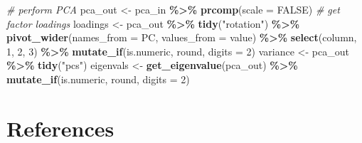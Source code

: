 \documentclass[12pt,twoside]{reedthesis}
\newenvironment{Shaded}{\begin{snugshade}}{\end{snugshade}}
\newcommand{\CommentTok}[1]{\textcolor[rgb]{0.56,0.35,0.01}{\textit{#1}}}
\newcommand{\DataTypeTok}[1]{\textcolor[rgb]{0.13,0.29,0.53}{#1}}
\newcommand{\DecValTok}[1]{\textcolor[rgb]{0.00,0.00,0.81}{#1}}
\newcommand{\KeywordTok}[1]{\textcolor[rgb]{0.13,0.29,0.53}{\textbf{#1}}}
\newcommand{\NormalTok}[1]{#1}
\newcommand{\OperatorTok}[1]{\textcolor[rgb]{0.81,0.36,0.00}{\textbf{#1}}}
\newcommand{\OtherTok}[1]{\textcolor[rgb]{0.56,0.35,0.01}{#1}}
\newcommand{\StringTok}[1]{\textcolor[rgb]{0.31,0.60,0.02}{#1}}
\begin{document}
\begin{Shaded}
\begin{Highlighting}[]
\CommentTok{\# perform PCA}
\NormalTok{pca\_out \textless{}{-}}\StringTok{ }\NormalTok{pca\_in }\OperatorTok{\%\textgreater{}\%}
\StringTok{  }\KeywordTok{prcomp}\NormalTok{(}\DataTypeTok{scale =} \OtherTok{FALSE}\NormalTok{)}
\CommentTok{\# get factor loadings}
\NormalTok{loadings \textless{}{-}}\StringTok{ }\NormalTok{pca\_out }\OperatorTok{\%\textgreater{}\%}
\StringTok{  }\KeywordTok{tidy}\NormalTok{(}\StringTok{"rotation"}\NormalTok{) }\OperatorTok{\%\textgreater{}\%}
\StringTok{  }\KeywordTok{pivot\_wider}\NormalTok{(}\DataTypeTok{names\_from =}\NormalTok{ PC, }\DataTypeTok{values\_from =}\NormalTok{ value) }\OperatorTok{\%\textgreater{}\%}
\StringTok{  }\KeywordTok{select}\NormalTok{(column, }\StringTok{\textasciigrave{}}\DataTypeTok{1}\StringTok{\textasciigrave{}}\NormalTok{, }\StringTok{\textasciigrave{}}\DataTypeTok{2}\StringTok{\textasciigrave{}}\NormalTok{, }\StringTok{\textasciigrave{}}\DataTypeTok{3}\StringTok{\textasciigrave{}}\NormalTok{) }\OperatorTok{\%\textgreater{}\%}\StringTok{ }
\StringTok{  }\KeywordTok{mutate\_if}\NormalTok{(is.numeric, round, }\DataTypeTok{digits =} \DecValTok{2}\NormalTok{)}
\NormalTok{variance \textless{}{-}}\StringTok{ }\NormalTok{pca\_out }\OperatorTok{\%\textgreater{}\%}
\StringTok{  }\KeywordTok{tidy}\NormalTok{(}\StringTok{"pcs"}\NormalTok{)}
\NormalTok{eigenvals \textless{}{-}}\StringTok{ }\KeywordTok{get\_eigenvalue}\NormalTok{(pca\_out) }\OperatorTok{\%\textgreater{}\%}\StringTok{ }\KeywordTok{mutate\_if}\NormalTok{(is.numeric, round, }\DataTypeTok{digits =} \DecValTok{2}\NormalTok{)}
\end{Highlighting}
\end{Shaded}
\backmatter

\hypertarget{references}{%
\chapter*{References}\label{references}}


\noindent

\setlength{\parindent}{-0.20in}
\setlength{\leftskip}{0.20in}
\setlength{\parskip}{8pt}
\end{document}
